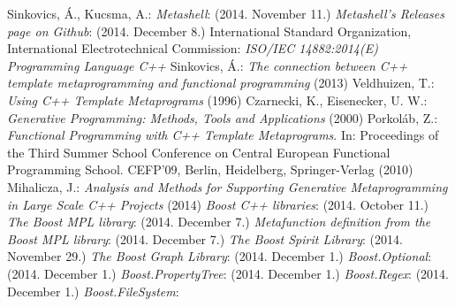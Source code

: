 
\begin{thebibliography}{99}
    Sinkovics, Á., Kucsma, A.:
    \textit{Metashell}:
     (2014. November 11.)
    \textit{Metashell's Releases page on Github}:
     (2014. December 8.)
    International Standard Organization, International Electrotechnical
    Commission: \textit{ISO/IEC 14882:2014(E) Programming Language C++}
    Sinkovics, Á.:
    \textit{The connection between C++ template metaprogramming and functional
    programming} (2013)
    Veldhuizen, T.:
    \textit{ Using C++ Template Metaprograms} (1996)
    Czarnecki, K., Eisenecker, U. W.:
    \textit{Generative Programming: Methods, Tools and Applications} (2000)
    Porkoláb, Z.:
    \textit{Functional Programming with C++ Template Metaprograms}.
    In: Proceedings of the Third Summer School Conference on
    Central European Functional Programming School. CEFP’09, Berlin,
    Heidelberg, Springer-Verlag (2010)
    Mihalicza, J.:
    \textit{Analysis and Methods for Supporting Generative Metaprogramming in
    Large Scale C++ Projects} (2014)
    \textit{Boost C++ libraries}:
     (2014. October 11.)
    \textit{The Boost MPL library}:
    (2014. December 7.)
    \textit{Metafunction definition from the Boost MPL library}:
    (2014. December 7.)
    \textit{The Boost Spirit Library}:
     (2014. November 29.)
    \textit{The Boost Graph Library}:
    (2014. December 1.)
    \textit{Boost.Optional}:
    (2014. December 1.)
    \textit{Boost.PropertyTree}:
    (2014. December 1.)
    \textit{Boost.Regex}:
    (2014. December 1.)
    \textit{Boost.FileSystem}:

\end{thebibliography}
